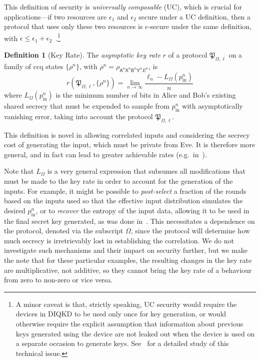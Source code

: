 \documentclass[10pt, a4paper]{article}
\numberwithin{equation}{section} %
\newcounter{stmt} %
\theoremstyle{definition}
\newtheorem{defn}[stmt]{Definition}
\theoremstyle{plain}
\newcommand{\?}{\mathrel{?}} %
\newcommand{\crv}[1]{\mathsf{#1}}
\newcommand{\proto}[2][_{\Omega,\ell}]{\mathfrak{#2}#1}
\newcommand{\prin}[1][p]{#1_{\mathrm{in}}}
\begin{document}
    This definition of security is \emph{universally composable} (UC), which is crucial for applications---if two resources are \(\epsilon_1\) and \(\epsilon_2\) secure under a UC definition, then a protocol that uses only these two resources is \(\epsilon\)-secure under the same definition, with \(\epsilon \leq \epsilon_1 + \epsilon_2\)~\cite{SecurityQKD}.\footnote{A minor caveat is that, strictly speaking, UC security would require the devices in DIQKD to be used only once for key generation, or would otherwise require the explicit assumption that information about previous keys generated using the device are not leaked out when the device is used on a separate occasion to generate keys. See~\cite{SecurityQKD} for a detailed study of this technical issue.}

    \begin{defn}[Key Rate]
      The \emph{asymptotic key rate} \(r\) of a protocol \(\proto{P}\) on a family of ccq states \({\{\rho^{n}\}}\), with \(\rho^{n} = \rho_{\crv{A}^n\crv{X}^n \crv{B}^n\crv{Y}^n E^n}\), is
    \begin{equation}
      r(\proto{P}, \{\rho^n\}) = \lim_{n\to\infty} \frac{\ell_n - L_{\Omega}(\prin^n)}{n}
    \end{equation}
    where \(L_{\Omega}(\prin^n)\) is the minimum number of bits in Alice and Bob's existing shared secrecy that must be expended to sample from \(\prin^n\) with asymptotically vanishing error, taking into account the protocol \(\proto{P}\).
  \end{defn}

    This definition is novel in allowing correlated inputs and considering the secrecy cost of generating the input, which must be private from Eve. It is therefore more general, and in fact can lead to greater achievable rates (e.g.\ in~\cite[Prot. 2]{DIQKD_FiniteSize}).

    Note that \(L_{\Omega}\) is a very general expression that subsumes all modifications that must be made to the key rate in order to account for the generation of the inputs. For example, it might be possible to \emph{post-select} a fraction of the rounds based on the inputs used so that the effective input distribution simulates the desired \(\prin^n\), or to \emph{recover} the entropy of the input data, allowing it to be used in the final secret key generated, as was done in~\cite[Prot. 2]{DIQKD_FiniteSize}. This necessitates a dependence on the protocol, denoted via the subscript \(\Omega\), since the protocol will determine how much secrecy is irretrievably lost in establishing the correlation. We do not investigate such mechanisms and their impact on security further, but we make the note that for these particular examples, the resulting changes in the key rate are multiplicative, not additive, so they cannot bring the key rate of a behaviour from zero to non-zero or vice versa.
\end{document}
